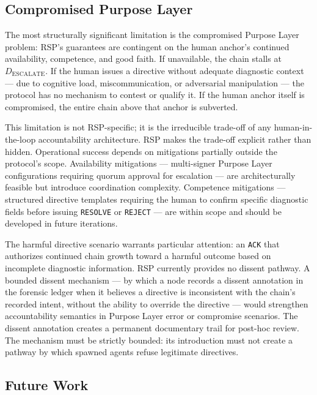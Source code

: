 \subsection{Compromised Purpose Layer}
\label{sec:rs-purpose-compromise}

The most structurally significant limitation is the compromised Purpose Layer problem: RSP's guarantees are contingent on the human anchor's continued availability, competence, and good faith. If unavailable, the chain stalls at $D_{\text{ESCALATE}}$. If the human issues a directive without adequate diagnostic context --- due to cognitive load, miscommunication, or adversarial manipulation --- the protocol has no mechanism to contest or qualify it. If the human anchor itself is compromised, the entire chain above that anchor is subverted.

This limitation is not RSP-specific; it is the irreducible trade-off of any human-in-the-loop accountability architecture. RSP makes the trade-off explicit rather than hidden. Operational success depends on mitigations partially outside the protocol's scope. Availability mitigations --- multi-signer Purpose Layer configurations requiring quorum approval for escalation --- are architecturally feasible but introduce coordination complexity. Competence mitigations --- structured directive templates requiring the human to confirm specific diagnostic fields before issuing \texttt{RESOLVE} or \texttt{REJECT} --- are within scope and should be developed in future iterations.

The harmful directive scenario warrants particular attention: an \texttt{ACK} that authorizes continued chain growth toward a harmful outcome based on incomplete diagnostic information. RSP currently provides no dissent pathway. A bounded dissent mechanism --- by which a node records a dissent annotation in the forensic ledger when it believes a directive is inconsistent with the chain's recorded intent, without the ability to override the directive --- would strengthen accountability semantics in Purpose Layer error or compromise scenarios. The dissent annotation creates a permanent documentary trail for post-hoc review. The mechanism must be strictly bounded: its introduction must not create a pathway by which spawned agents refuse legitimate directives.

\subsection{Future Work}
\label{sec:rs-future-work}


